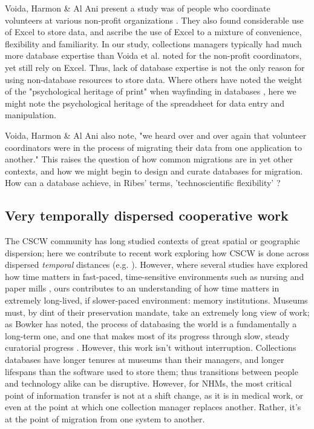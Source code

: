 Voida, Harmon & Al Ani present a study was of people who coordinate volunteers at various non-profit organizations \cite{voida2011homebrew}. They also found considerable use of Excel to store data, and ascribe the use of Excel to a mixture of convenience, flexibility and familiarity. In our study, collections managers typically had much more database expertise than Voida et al. noted for the non-profit coordinators, yet still rely on Excel. Thus, lack of database expertise is not the only reason for using non-database resources to store data. Where others have noted the weight of the "psychological heritage of print" when wayfinding in databases \cite{Kerr_1990}, here we might note the psychological heritage of the spreadsheet for data entry and manipulation.

Voida, Harmon & Al Ani also note, "we heard over and over again that volunteer coordinators were in the process of migrating their data from one application to another." This raises the question of how common migrations are in yet other contexts, and how we might begin to design and curate databases for migration. How can a database achieve, in Ribes' terms, 'technoscientific flexibility' \cite{ribes2014kernel}?

\subsection{Very temporally dispersed cooperative work}

The CSCW community has long studied contexts of great spatial or geographic dispersion; here we contribute to recent work exploring how CSCW is done across dispersed \textit{temporal} distances (e.g. \cite{Jackson_2011, Lindley_2015}). However, where several studies have explored how time matters in fast-paced, time-sensitive environments such as nursing \cite{sarcevic2009information, Reddy_2006} and paper mills \cite{auramaki1996paperwork}, ours contributes to an understanding of how time matters in extremely long-lived, if slower-paced environment: memory institutions. Museums must, by dint of their preservation mandate, take an extremely long view of work; as Bowker has noted, the process of databasing the world is a fundamentally a long-term one, and one that makes most of its progress through slow, steady curatorial progress \cite{Bowker_2000}. However, this work isn't without interruption. Collections databases have longer tenures at museums than their managers, and longer lifespans than the software used to store them; thus transitions between people and technology alike can be disruptive. However, for NHMs, the most critical point of information transfer is not at a shift change, as it is in medical work, or even at the point at which one collection manager replaces another. Rather, it's at the point of migration from one system to another.

